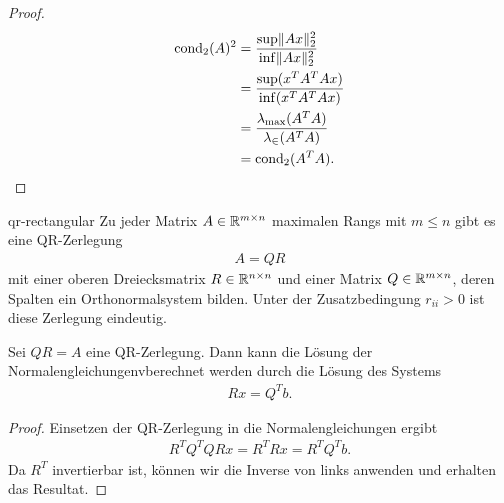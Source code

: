 \begin{proof}
  \begin{align}
    \operatorname{cond}_2(A)^2  &= \frac{\sup\lVert Ax\rVert_2^2}{\inf\lVert Ax\rVert_2^2}\\
                  &= \frac{\sup(x^TA^TAx)}{\inf(x^TA^TAx)}\\
                  &= \frac{\lambda_{\max}(A^TA)}{\lambda_{\in}(A^TA)}\\
                  &= \operatorname{cond}_2(A^TA).
  \end{align}
\end{proof}


\begin{Lemma}{qr-rectangular}
  Zu jeder Matrix $A\in \mathbb R^{m\times n}$ maximalen Rangs mit $m\le n$
  gibt es eine QR-Zerlegung
  \begin{gather}
  A = QR
  \end{gather}
  mit einer oberen Dreiecksmatrix $R\in\mathbb R^{n\times n}$ und einer Matrix $Q\in\mathbb R^{m\times n}$, deren Spalten ein Orthonormalsystem bilden.
  Unter der Zusatzbedingung $r_{ii}>0$ ist
  diese Zerlegung eindeutig.
\end{Lemma}

\begin{Satz}
  Sei $QR=A$ eine QR-Zerlegung. Dann kann die Lösung der Normalengleichungenvberechnet werden durch die Lösung des Systems
  \begin{gather}
    Rx = Q^Tb.
  \end{gather}
\end{Satz}

\begin{proof}
  Einsetzen der QR-Zerlegung in die Normalengleichungen ergibt
  \begin{gather}
  R^TQ^TQR x = R^T R x = R^TQ^T b.
  \end{gather}
  Da $R^T$ invertierbar ist, können wir die Inverse von links anwenden und erhalten das Resultat.
\end{proof}


